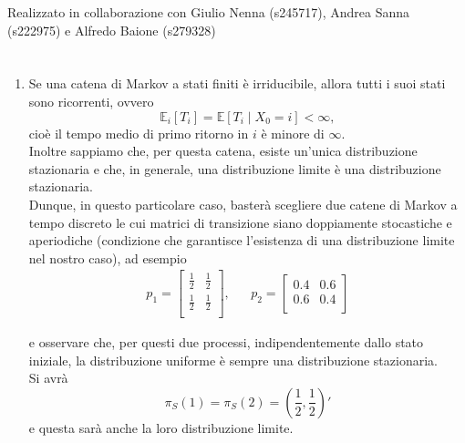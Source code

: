 \documentclass[12pt]{homework}
\begin{document}
\maketitle
\begin{center}
Realizzato in collaborazione con Giulio Nenna (s245717), Andrea Sanna (s222975) e Alfredo Baione (s279328)
\end{center}
\section{}
\begin{enumerate}


  
    \item
    Se una catena di Markov a stati finiti è irriducibile, allora tutti i suoi stati sono ricorrenti, ovvero
    \begin{equation*}
    \mathbb{E}_{i}[T_{i}]=\mathbb{E}[T_{i}\mid X_{0}=i]<\infty,
    \end{equation*}
    cioè il tempo medio di primo ritorno in $i$ è minore di $\infty$.\\
    Inoltre sappiamo che, per questa catena, esiste un'unica distribuzione stazionaria e che, in generale, una distribuzione limite è una distribuzione stazionaria.\\
    Dunque, in questo particolare caso, basterà scegliere due catene di Markov a tempo discreto le cui matrici di transizione siano doppiamente stocastiche e aperiodiche (condizione che garantisce l'esistenza di una distribuzione limite nel nostro caso), ad esempio
    \begin{align*}
    p_{1}=\begin{bmatrix}
        \frac{1}{2} & \frac{1}{2}\\
        \frac{1}{2} & \frac{1}{2} \\ 
      \end{bmatrix}, &&  
      p_{2}=\begin{bmatrix}
         0.4 & 0.6\\
        0.6 & 0.4 \\ 
      \end{bmatrix}
    \end{align*}
    
    e osservare che, per questi due processi, indipendentemente dallo stato iniziale, la distribuzione uniforme è sempre una distribuzione stazionaria. \\
    Si avrà
    \begin{equation*}
    \pi_{S}\left(1\right)=\pi_{S}\left(2\right)= \left(\frac{1}{2},\frac{1}{2}\right)'
    \end{equation*}
     e questa sarà anche la loro distribuzione limite.
     \newpage
     

\end{enumerate}
\end{document}
